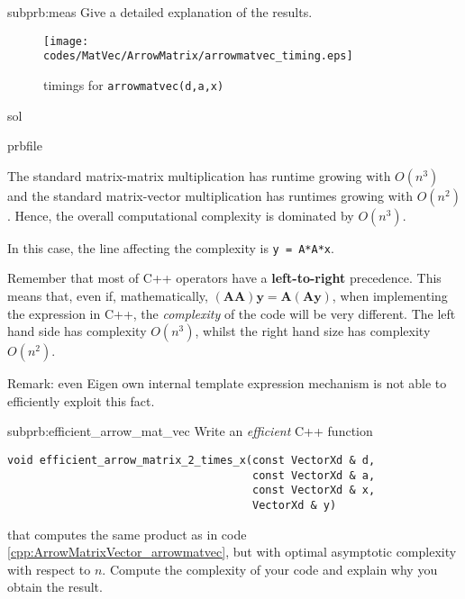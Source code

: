 \begin{samproblem}
\begin{subproblem}{subprb:meas}
  Give a detailed explanation of the results.

 \begin{figure}[ht]
   \centering
   \texttt{[image: \\codes/MatVec/ArrowMatrix/arrowmatvec\_timing.eps]}
   \caption{timings for \texttt{arrowmatvec(d,a,x)}}
   \label{fig:arrowmatvectiming}
 \end{figure}

 \begin{samwriteprbpart}{sol}
    \begin{writeverbatim}{prbfile}
      \begin{samsolution}
        The standard matrix-matrix multiplication has runtime growing with $O(n^3)$
        and the standard
        matrix-vector multiplication has runtimes growing with $O(n^2)$. Hence, the overall
        computational complexity is dominated by $O(n^3)$.

        In this case, the line affecting the complexity is \texttt{y = A*A*x}.

        Remember that most of C++ operators have a \textbf{left-to-right} precedence.
        This means that,
        even if,
        mathematically, $(\mathbf{A} \mathbf{A}) \mathbf{y} = \mathbf{A} (\mathbf{A} \mathbf{y})$,
        when
        implementing the expression in C++, the \emph{complexity} of the code will
        be very different. The left hand
        side has complexity $O(n^3)$, whilst the right hand size has complexity $O(n^2)$.

        Remark: even Eigen own internal template expression mechanism is not
        able to efficiently exploit this fact.
      \end{samsolution}
    \end{writeverbatim}
  \end{samwriteprbpart}
\end{subproblem}

\begin{subproblem}{subprb:efficient_arrow_mat_vec}
Write an \emph{efficient} C++ function
\begin{verbatim}
void efficient_arrow_matrix_2_times_x(const VectorXd & d,
                                      const VectorXd & a,
                                      const VectorXd & x,
                                      VectorXd & y)
\end{verbatim}
that computes the same product as in code \ref{cpp:ArrowMatrixVector_arrowmatvec},
but with optimal asymptotic complexity with respect to {$n$}.
Compute the complexity of your code and
explain why you obtain the result.


\end{subproblem}
\end{samproblem}
